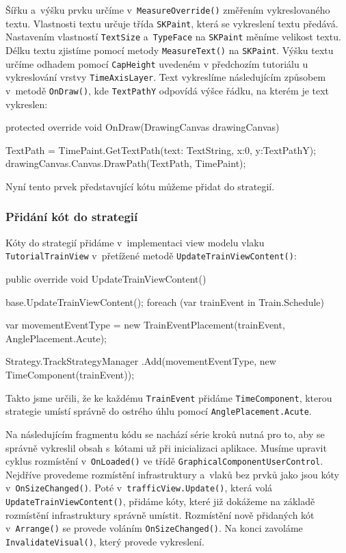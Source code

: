 Šířku a~výšku prvku určíme v~\texttt{MeasureOverride()} změřením vykreslovaného textu. Vlastnosti textu určuje třída \texttt{SKPaint}, která se vykreslení textu předává. Nastavením vlastností \texttt{TextSize} a~\texttt{TypeFace} na \texttt{SKPaint} měníme velikost textu. Délku textu zjistíme pomocí metody \texttt{MeasureText()} na \texttt{SKPaint}. Výšku textu určíme odhadem pomocí \texttt{CapHeight} uvedeném v předchozím tutoriálu u vykreslování vrstvy \texttt{TimeAxisLayer}. Text vykreslíme následujícím způsobem v~metodě \texttt{OnDraw()}, kde \texttt{TextPathY} odpovídá výšce řádku, na kterém je text vykreslen:
\begin{csharpcode}
protected override void OnDraw(DrawingCanvas drawingCanvas) {

  TextPath = TimePaint.GetTextPath(text: TextString, x:0, y:TextPathY);
  drawingCanvas.Canvas.DrawPath(TextPath, TimePaint);
}
\end{csharpcode}

Nyní tento prvek představující kótu můžeme přidat do strategií.

\subsubsection*{Přidání kót do strategií}
Kóty do strategií přidáme v~implementaci view modelu vlaku \linebreak\texttt{TutorialTrainView} v~přetížené metodě \texttt{UpdateTrainViewContent()}:
\begin{csharpcode}

public override void UpdateTrainViewContent() {

  base.UpdateTrainViewContent();
  foreach (var trainEvent in Train.Schedule) {

	var movementEventType =
    new TrainEventPlacement(trainEvent, AnglePlacement.Acute);
   
	Strategy.TrackStrategyManager
    .Add(movementEventType, new TimeComponent(trainEvent));
 }
}
\end{csharpcode}

Takto jsme určili, že ke každému \texttt{TrainEvent} přidáme \texttt{TimeComponent}, kterou strategie umístí správně do ostrého úhlu pomocí \texttt{AnglePlacement.Acute}. 

Na následujícím fragmentu kódu se nachází série kroků nutná pro to, aby se správně vykreslil obsah s~kótami už při inicializaci aplikace. Musíme upravit cyklus rozmístění v~\texttt{OnLoaded()} ve třídě \texttt{GraphicalComponentUserControl}. Nejdříve provedeme rozmístění infrastruktury a~vlaků bez prvků jako jsou kóty \linebreak v~\texttt{OnSizeChanged()}. Poté v~\texttt{trafficView.Update()}, která volá \linebreak \texttt{UpdateTrainViewContent()}, přidáme kóty, které již dokážeme na základě rozmístění infrastruktury správně umístit. Rozmístění nově přidaných kót \linebreak v~\texttt{Arrange()} se provede voláním \texttt{OnSizeChanged()}. Na konci zavoláme \linebreak \texttt{InvalidateVisual()}, který provede vykreslení.

